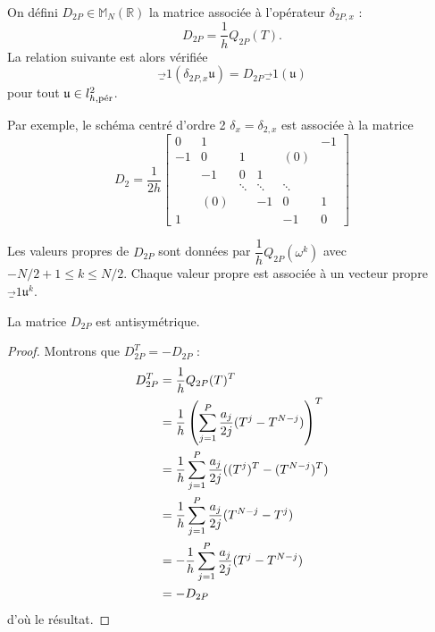 On défini $D_{2P} \in \mathbb{M}_N(\mathbb{R})$ la matrice associée à l'opérateur $\delta_{2P,x}$ :
\begin{equation}
D_{2P} = \dfrac{1}{h} Q_{2P}(T).
\end{equation}
La relation suivante est alors vérifiée
\begin{equation}
\vec_1(\delta_{2P,x} \mathfrak{u}) = D_{2P} \vec_1 ( \mathfrak{u} )
\end{equation}
pour tout $\mathfrak{u} \in l^2_{h,\per}$.

Par exemple, le schéma centré d'ordre 2 $\delta_x = \delta_{2,x}$ est associée à la matrice
\begin{equation}
D_2 = \dfrac{1}{2h}
\begin{bmatrix}
0 & 1 &   &   &   & -1 \\ 
-1 & 0 & 1 &   & (0) &   \\ 
  & -1 & 0 & 1 &   &   \\ 
  &   & \ddots & \ddots & \ddots &   \\ 
  & (0) &   & -1 & 0 & 1 \\ 
1 &   &   &   & -1 & 0
\end{bmatrix} 
\end{equation}

\begin{proposition}
Les valeurs propres de $D_{2P}$ sont données par $\dfrac{1}{h}Q_{2P}(\omega^k)$ avec $-N/2 +1 \leq k \leq N/2$. Chaque valeur propre est associée à un vecteur propre $\vec_1{\mathfrak{u}^k}$.
\end{proposition}

\begin{proposition}
La matrice $D_{2P}$ est antisymétrique.
\end{proposition}

\begin{proof}
Montrons que $D_{2P}^T = - D_{2P}$ :
\begin{align*}
D_{2P}^T & = \dfrac{1}{h} Q_{2P}(T)^T \\
	& = \dfrac{1}{h} \left( \gsum_{j=1}^P \dfrac{a_j}{2j} (T^j - T^{N-j}) \right)^T\\
	& = \dfrac{1}{h}\gsum_{j=1}^P \dfrac{a_j}{2j} ((T^j)^T - (T^{N-j})^T) \\
	& = \dfrac{1}{h}\gsum_{j=1}^P \dfrac{a_j}{2j} (T^{N-j} - T^{j}) \\
	& = - \dfrac{1}{h} \gsum_{j=1}^P \dfrac{a_j}{2j} (T^j - T^{N-j}) \\
	& = - D_{2P}
\end{align*}
d'où le résultat.
\end{proof}






























